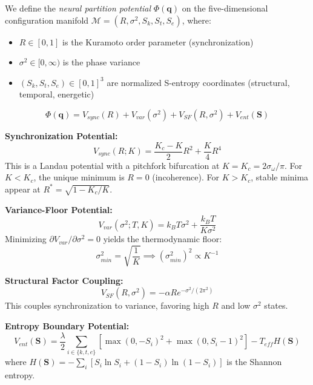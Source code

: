 \documentclass[12pt,a4paper]{article}
\begin{document}
We define the \textit{neural partition potential} $\Phi(\mathbf{q})$ on the five-dimensional configuration manifold $\mathcal{M} = (R, \sigma^2, S_k, S_t, S_e)$, where:
\begin{itemize}
\item $R \in [0,1]$ is the Kuramoto order parameter (synchronization)
\item $\sigma^2 \in [0,\infty)$ is the phase variance
\item $(S_k, S_t, S_e) \in [0,1]^3$ are normalized S-entropy coordinates (structural, temporal, energetic)
\end{itemize}

\begin{equation}
\Phi(\mathbf{q}) = V_{sync}(R) + V_{var}(\sigma^2) + V_{SF}(R,\sigma^2) + V_{ent}(\mathbf{S})
\end{equation}

\textbf{Synchronization Potential:}
\begin{equation}
V_{sync}(R; K) = \frac{K_c - K}{2} R^2 + \frac{K}{4} R^4
\end{equation}
This is a Landau potential with a pitchfork bifurcation at $K = K_c = 2\sigma_\omega/\pi$. For $K < K_c$, the unique minimum is $R=0$ (incoherence). For $K > K_c$, stable minima appear at $R^* = \sqrt{1 - K_c/K}$.

\textbf{Variance-Floor Potential:}
\begin{equation}
V_{var}(\sigma^2; T, K) = k_B T \sigma^2 + \frac{k_B T}{K\sigma^2}
\end{equation}
Minimizing $\partial V_{var}/\partial \sigma^2 = 0$ yields the thermodynamic floor:
\begin{equation}
\sigma^2_{min} = \sqrt{\frac{1}{K}} \implies (\sigma^2_{min})^2 \propto K^{-1}
\end{equation}

\textbf{Structural Factor Coupling:}
\begin{equation}
V_{SF}(R,\sigma^2) = -\alpha R e^{-\sigma^2/(2\pi^2)}
\end{equation}
This couples synchronization to variance, favoring high $R$ and low $\sigma^2$ states.

\textbf{Entropy Boundary Potential:}
\begin{equation}
V_{ent}(\mathbf{S}) = \frac{\lambda}{2} \sum_{i \in \{k,t,e\}} \left[ \max(0,-S_i)^2 + \max(0,S_i-1)^2 \right] - T_{eff} H(\mathbf{S})
\end{equation}
where $H(\mathbf{S}) = -\sum_i [S_i \ln S_i + (1-S_i)\ln(1-S_i)]$ is the Shannon entropy.
\end{document}
